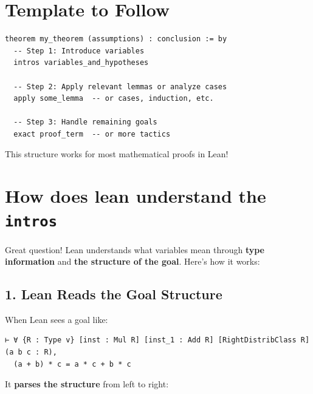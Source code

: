 \documentclass{amsart}
\theoremstyle{plain}
\theoremstyle{definition}
\theoremstyle{remark}
\begin{document}
\section{\textbf{Template to Follow}}

\begin{lstlisting}[language=lean]
theorem my_theorem (assumptions) : conclusion := by
  -- Step 1: Introduce variables
  intros variables_and_hypotheses
  
  -- Step 2: Apply relevant lemmas or analyze cases
  apply some_lemma  -- or cases, induction, etc.
  
  -- Step 3: Handle remaining goals
  exact proof_term  -- or more tactics
\end{lstlisting}
This structure works for most mathematical proofs in Lean!

\section{How does lean understand the \lstinline{intros}}

Great question! Lean understands what variables mean through \textbf{type information} and \textbf{the structure of the goal}. Here's how it works:


\subsection{\textbf{1. Lean Reads the Goal Structure}}

When Lean sees a goal like:

\begin{lstlisting}[language=lean]
⊢ ∀ {R : Type v} [inst : Mul R] [inst_1 : Add R] [RightDistribClass R] (a b c : R), 
  (a + b) * c = a * c + b * c
\end{lstlisting}
It \textbf{parses the structure} from left to right:

\end{document}
